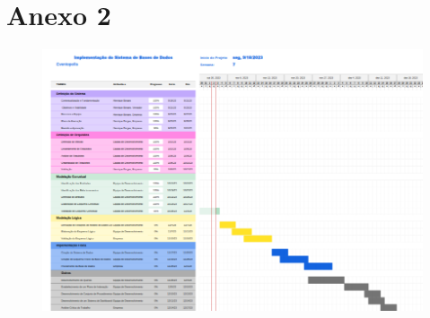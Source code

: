 \documentclass[a4paper,12pt]{scrreprt}
\begin{document}
    \section{Anexo 2} \label{GANTT_c2}
        \begin{figure}[h]
            \centering
            \includegraphics[width=6.2in]{images/GANTT_c2.png}
        \end{figure}

\end{document}

